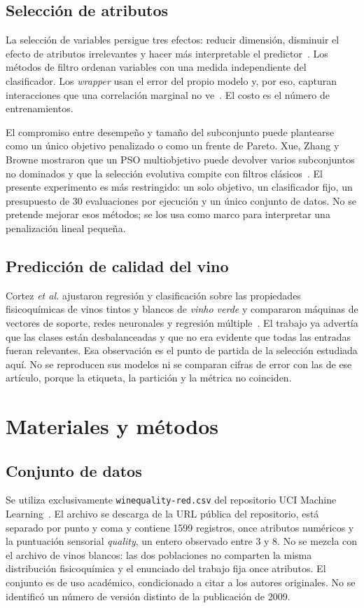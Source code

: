 \documentclass[conference]{IEEEtran}
\begin{document}
\subsection{Selección de atributos}
La selección de variables persigue tres efectos: reducir dimensión, disminuir el efecto de atributos irrelevantes y hacer más interpretable el predictor~\cite{guyon2003}. Los métodos de filtro ordenan variables con una medida independiente del clasificador. Los \emph{wrapper} usan el error del propio modelo y, por eso, capturan interacciones que una correlación marginal no ve~\cite{kohavi1997}. El costo es el número de entrenamientos.

El compromiso entre desempeño y tamaño del subconjunto puede plantearse como un único objetivo penalizado o como un frente de Pareto. Xue, Zhang y Browne mostraron que un PSO multiobjetivo puede devolver varios subconjuntos no dominados y que la selección evolutiva compite con filtros clásicos~\cite{xue2013,xue2016}. El presente experimento es más restringido: un solo objetivo, un clasificador fijo, un presupuesto de 30 evaluaciones por ejecución y un único conjunto de datos. No se pretende mejorar esos métodos; se los usa como marco para interpretar una penalización lineal pequeña.

\subsection{Predicción de calidad del vino}
Cortez \emph{et al.} ajustaron regresión y clasificación sobre las propiedades fisicoquímicas de vinos tintos y blancos de \emph{vinho verde} y compararon máquinas de vectores de soporte, redes neuronales y regresión múltiple~\cite{cortez2009}. El trabajo ya advertía que las clases están desbalanceadas y que no era evidente que todas las entradas fueran relevantes. Esa observación es el punto de partida de la selección estudiada aquí. No se reproducen sus modelos ni se comparan cifras de error con las de ese artículo, porque la etiqueta, la partición y la métrica no coinciden.

\section{Materiales y métodos}

\subsection{Conjunto de datos}
Se utiliza exclusivamente \texttt{winequality-red.csv} del repositorio UCI Machine Learning~\cite{cortez2009,uci186}. El archivo se descarga de la URL pública del repositorio, está separado por punto y coma y contiene 1599 registros, once atributos numéricos y la puntuación sensorial \emph{quality}, un entero observado entre 3 y 8. No se mezcla con el archivo de vinos blancos: las dos poblaciones no comparten la misma distribución fisicoquímica y el enunciado del trabajo fija once atributos. El conjunto es de uso académico, condicionado a citar a los autores originales. No se identificó un número de versión distinto de la publicación de 2009.
\end{document}
